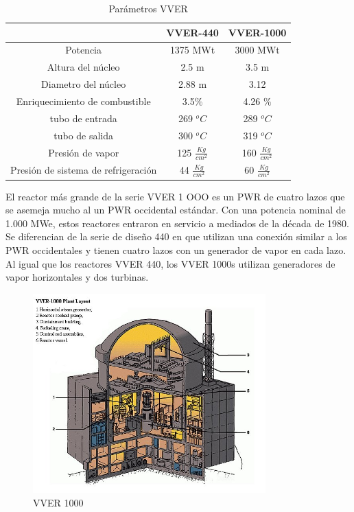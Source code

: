 \documentclass[]{article}
\begin{document}
\begin{table}[h!]
	\centering
	\begin{tabular}{|c|c|c|}
		\hline
		
		         & VVER-440 & VVER-1000 \\ \hline
		Potencia & 1375 MWt & 3000 MWt \\ \hline
		Altura del núcleo & 2.5 m & 3.5 m \\ \hline
		Diametro del núcleo & 2.88 m & 3.12 \\ \hline
		Enriquecimiento de combustible & 3.5$\%$ & 4.26 $\%$\\ \hline
		tubo de entrada & 269 $^oC$ & 289 $^oC$  \\ \hline
		tubo de salida & 300 $^oC$ & 319 $^oC$ \\ \hline
		Presión de vapor & 125 $\frac{Kg}{cm^2}$ & 160 $\frac{Kg}{cm^2}$ \\ \hline
		Presión de sistema de refrigeración &  44 $\frac{Kg}{cm^2}$ & 60 $\frac{Kg}{cm^2}$\\ \hline
	\end{tabular}
  \caption{Parámetros VVER}
  \label{parametrosVVER}
\end{table}


El reactor más grande de la serie VVER 1 OOO es un PWR de cuatro lazos que se asemeja mucho al un PWR occidental estándar. Con una potencia nominal de 1.000 MWe, estos reactores entraron en servicio a mediados de la década de 1980. Se diferencian de la serie de diseño 440 en que utilizan una conexión similar a los PWR occidentales y tienen cuatro lazos con un generador de vapor en cada lazo. Al igual que los reactores VVER 440, los VVER 1000s utilizan generadores de vapor horizontales y dos turbinas.\\

\begin{figure}[h!]
	\centering
	\includegraphics[width=0.8\textwidth]{vver-1000-layout}
	\caption{VVER 1000}
	\label{fig:VVER_1000}
\end{figure}
\end{document}
